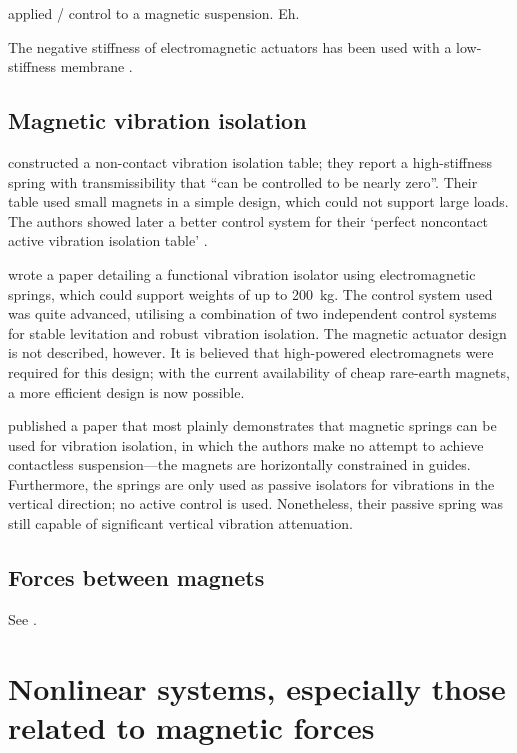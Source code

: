 \textcite{gosiewski2008} applied \Hinf/ control to a magnetic suspension.
Eh.

The negative stiffness of electromagnetic actuators has been used with a low-stiffness membrane \cite{sato2001}.


\subsection{Magnetic vibration isolation}

\textcite{nagaya1993} constructed a non-contact vibration isolation table; they report a high-stiffness spring with transmissibility that \enquote{can be controlled to be nearly zero}.
Their table used small magnets in a simple design, which could not support large loads.
The authors showed later a better control system for their `perfect noncontact active vibration isolation table' \cite{nagaya1995a}.

\textcite{watanabe1996} wrote a paper detailing a functional vibration isolator using electromagnetic springs, which could support weights of up to
\SI{200}{kg}.
The control system used was quite advanced, utilising a combination of two independent control systems for stable levitation and robust vibration isolation.
The magnetic actuator design is not described, however.
It is believed that high-powered electromagnets were required for this design; with the current availability of cheap rare-earth magnets, a more efficient design is now possible.

\textcite{puppin2002} published a paper that most plainly demonstrates that magnetic springs can be used for vibration isolation, in which the authors make no attempt to achieve contactless suspension—the magnets are horizontally constrained in guides.
Furthermore, the springs are only used as passive isolators for vibrations in the vertical direction; no active control is used.
Nonetheless, their passive spring was still capable of significant vertical vibration attenuation.


\subsection{Forces between magnets}

See .



\section{Nonlinear systems, especially those related to magnetic forces}

